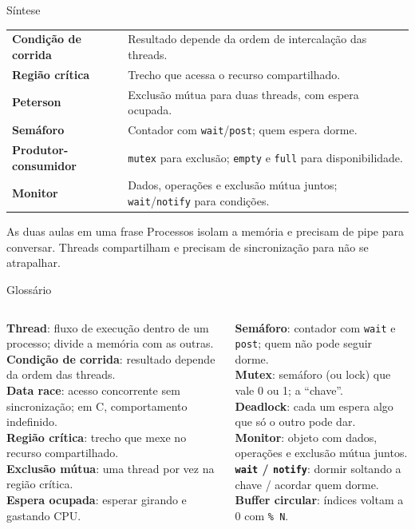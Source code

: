 \documentclass[aspectratio=169]{beamer}
\begin{document}
\begin{frame}{Síntese}
\begin{center}
\begin{tabular}{@{}lR{9.6cm}@{}}
\toprule
\textbf{Condição de corrida} & Resultado depende da ordem de intercalação das threads. \\
\textbf{Região crítica} & Trecho que acessa o recurso compartilhado. \\
\textbf{Peterson} & Exclusão mútua para duas threads, com espera ocupada. \\
\textbf{Semáforo} & Contador com \texttt{wait}/\texttt{post}; quem espera dorme. \\
\textbf{Produtor-consumidor} & \texttt{mutex} para exclusão; \texttt{empty} e \texttt{full} para disponibilidade. \\
\textbf{Monitor} & Dados, operações e exclusão mútua juntos; \texttt{wait}/\texttt{notify} para condições. \\
\bottomrule
\end{tabular}
\end{center}

\vspace{0.6em}
\begin{exampleblock}{As duas aulas em uma frase}
Processos isolam a memória e precisam de pipe para conversar. Threads compartilham e precisam de sincronização para não se atrapalhar.
\end{exampleblock}
\end{frame}

\begin{frame}{Glossário}
\footnotesize
\begin{columns}[T]
\textbf{Thread}: fluxo de execução dentro de um processo; divide a memória com as outras.\\[0.35em]
\textbf{Condição de corrida}: resultado depende da ordem das threads.\\[0.35em]
\textbf{Data race}: acesso concorrente sem sincronização; em C, comportamento indefinido.\\[0.35em]
\textbf{Região crítica}: trecho que mexe no recurso compartilhado.\\[0.35em]
\textbf{Exclusão mútua}: uma thread por vez na região crítica.\\[0.35em]
\textbf{Espera ocupada}: esperar girando e gastando CPU.

\textbf{Semáforo}: contador com \texttt{wait} e \texttt{post}; quem não pode seguir dorme.\\[0.35em]
\textbf{Mutex}: semáforo (ou lock) que vale 0 ou 1; a ``chave''.\\[0.35em]
\textbf{Deadlock}: cada um espera algo que só o outro pode dar.\\[0.35em]
\textbf{Monitor}: objeto com dados, operações e exclusão mútua juntos.\\[0.35em]
\textbf{\texttt{wait} / \texttt{notify}}: dormir soltando a chave / acordar quem dorme.\\[0.35em]
\textbf{Buffer circular}: índices voltam a 0 com \texttt{\% N}.
\end{columns}
\end{frame}
\end{document}
